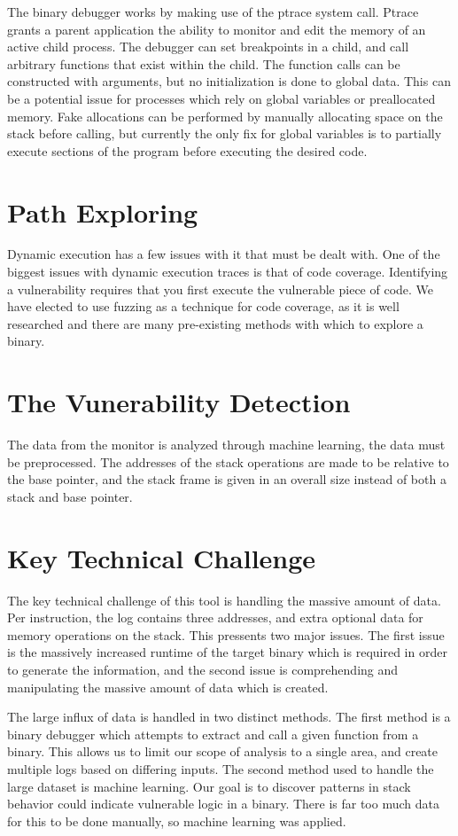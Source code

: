 \documentclass{article}
\begin{document}
The binary debugger works by making use of the ptrace system call. Ptrace grants
a parent application the ability to monitor and edit the memory of an active
child process. The debugger can set breakpoints in a child, and call arbitrary
functions that exist within the child. The function calls can be constructed
with arguments, but no initialization is done to global data.  This can be a
potential issue for processes which rely on global variables or preallocated
memory. Fake allocations can be performed by manually allocating space on the
stack before calling, but currently the only fix for global variables is to
partially execute sections of the program before executing the desired code.


\section {Path Exploring}
Dynamic execution has a few issues with it that must be dealt with. One of the
biggest issues with dynamic execution traces is that of code coverage.
Identifying a vulnerability requires that you first execute the vulnerable piece
of code. We have elected to use fuzzing as a technique for code coverage, as it
is well researched and there are many pre-existing methods with which to explore
a binary.

\section {The Vunerability Detection}
The data from the monitor is analyzed through machine learning, the data must be
preprocessed.  The addresses of the stack operations are made to be relative to
the base pointer, and the stack frame is given in an overall size instead of
both a stack and base pointer.

\section{Key Technical Challenge}

The key technical challenge of this tool is handling the massive amount of data.
Per instruction, the log contains three addresses, and extra optional data for
memory operations on the stack. This pressents two major issues. The first issue
is the massively increased runtime of the target binary which is required in
order to generate the information, and the second issue is comprehending and
manipulating the massive amount of data which is created.

The large influx of data is handled in two distinct methods. The first method is
a binary debugger which attempts to extract and call a given function from a
binary. This allows us to limit our scope of analysis to a single area, and
create multiple logs based on differing inputs. The second method used to handle
the large dataset is machine learning.  Our goal is to discover patterns in
stack behavior could indicate vulnerable logic in a binary.  There is far too
much data for this to be done manually, so machine learning was applied.
\end{document}
